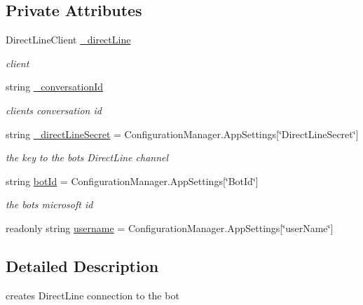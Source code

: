 \subsection*{Private Attributes}
\begin{DoxyCompactItemize}
\item 
Direct\+Line\+Client \hyperlink{class_wcf_service1_1_1_cortana_direct_line_client_a2161a12a94efe732c80a2f31f7a91d8d}{\+\_\+direct\+Line}
\begin{DoxyCompactList}\small\item\em client \end{DoxyCompactList}\item 
string \hyperlink{class_wcf_service1_1_1_cortana_direct_line_client_a460c7a68d595773d131142651fa2b213}{\+\_\+conversation\+Id}
\begin{DoxyCompactList}\small\item\em client\textquotesingle{}s conversation id \end{DoxyCompactList}\item 
string \hyperlink{class_wcf_service1_1_1_cortana_direct_line_client_a06b449cbb20e2a97dc873b306371b577}{\+\_\+direct\+Line\+Secret} = Configuration\+Manager.\+App\+Settings\mbox{[}\char`\"{}Direct\+Line\+Secret\char`\"{}\mbox{]}
\begin{DoxyCompactList}\small\item\em the key to the bot\textquotesingle{}s Direct\+Line channel \end{DoxyCompactList}\item 
string \hyperlink{class_wcf_service1_1_1_cortana_direct_line_client_a92b26da0f83e644653c3cd4f8c248b1b}{bot\+Id} = Configuration\+Manager.\+App\+Settings\mbox{[}\char`\"{}Bot\+Id\char`\"{}\mbox{]}
\begin{DoxyCompactList}\small\item\em the bot\textquotesingle{}s microsoft id \end{DoxyCompactList}\item 
readonly string \hyperlink{class_wcf_service1_1_1_cortana_direct_line_client_a5c02c54f3f2ed0d5c508092e516cb5d9}{username} = Configuration\+Manager.\+App\+Settings\mbox{[}\char`\"{}user\+Name\char`\"{}\mbox{]}
\end{DoxyCompactItemize}


\subsection{Detailed Description}
creates Direct\+Line connection to the bot 



